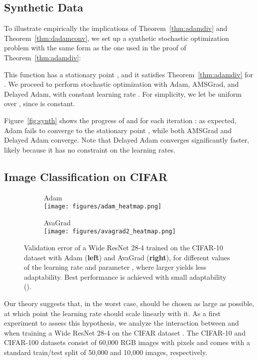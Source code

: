 \documentclass{article}
\newcommand{\thmref}[1]{Theorem~\ref{#1}}
\begin{document}
\subsection{Synthetic Data}

To illustrate empirically the implications of \thmref{thm:adamdiv} and
\thmref{thm:dadamconv}, we set up a synthetic stochastic optimization problem
with the same form as the one used in the proof of \thmref{thm:adamdiv}:

This function has a stationary point
, and it satisfies
\thmref{thm:adamdiv} for .
We proceed to perform stochastic optimization with Adam, AMSGrad, and Delayed
Adam, with constant learning rate .  For simplicity, we let
 be uniform over , since  is constant.

Figure~\ref{fig:synth} shows the progress of 
and  for each iteration
: as expected, Adam fails to converge to the stationary point ,
while both AMSGrad and Delayed Adam converge.  Note that Delayed Adam converges
significantly faster, likely because it has no constraint on the learning
rates.

\subsection{Image Classification on CIFAR}
\label{sec:cifar}
\begin{figure*}[bt!]
   \centering
   \begin{subfigure}{.5\textwidth}
      \centering
      \scriptsize{\textsf{Adam}}\\
      \texttt{[image: figures/adam\_heatmap.png]}
   \end{subfigure}\hfill
   \begin{subfigure}{.5\textwidth}
      \centering
      \scriptsize{\textsf{AvaGrad}}\\
      \texttt{[image: figures/avagrad2\_heatmap.png]}
   \end{subfigure}
   \caption{
      Validation error of a Wide ResNet 28-4 trained on the CIFAR-10
      dataset with Adam (\textbf{left}) and AvaGrad (\textbf{right}), for different values of the learning rate  and
      parameter , where larger  yields less
      adaptability. Best performance is achieved with small adaptability ().
   }
   \label{fig:cnns}
\end{figure*}
 
Our theory suggests that, in the worst case,  should be chosen as large as possible, at which point the learning rate  should scale linearly with it. As a first experiment to assess this hypothesis, we analyze the interaction between  and  when training a Wide ResNet 28-4 \citep{wide}
on the CIFAR dataset \citep{cifar}. The CIFAR-10 and CIFAR-100 datasets consist of 60,000 RGB images with  pixels and comes with a standard train/test split of 50,000 and 10,000 images, respectively.
\end{document}
